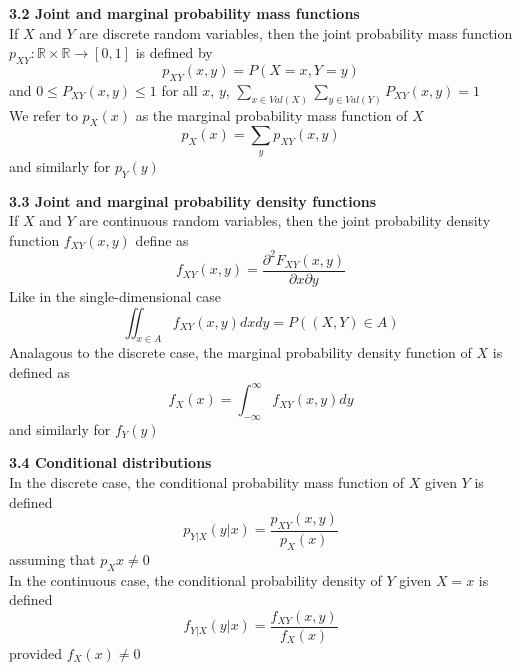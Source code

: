 \documentclass[10pt,a4paper,oneside]{beamer}
\begin{document}
\begin{frame}
\vspace{0.5cm}
{\bfseries 3.2 Joint and marginal probability mass functions} 
\vspace{0.5cm}
\\If $X$ and $Y$ are discrete random variables, then the joint probability mass function $p_{X Y} : \mathbb{R} \times \mathbb{R} \rightarrow[0,1]$ is defined by
\[
p_{X Y}(x, y)=P(X=x, Y=y)
\]
and  $0\leqslant P_{XY}(x,y)\leqslant1$ for all $x$, $y$,   $\sum_{x \in V a l(X)} \sum_{y \in V a l(Y)} P_{X Y}(x, y)=1$
\vspace{0.7cm}
\\We refer to $p_X(x)$ as the marginal probability mass function of $X$
\[
p_{X}(x)=\sum_{y} p_{X Y}(x, y)
\]
and similarly for $p_Y(y)$
\end{frame}
\begin{frame}
\vspace{0.3cm}
{\bfseries 3.3 Joint and marginal probability density functions} 
\vspace{0.5cm}
\\If $X$ and $Y$ are continuous random variables, then the joint probability density function $f_{X Y}(x,y)$ define as 
\[
f_{X Y}(x, y)=\frac{\partial^{2} F_{X Y}(x, y)}{\partial x \partial y}
\]
Like in the single-dimensional case
\[
\iint_{x \in A} f_{X Y}(x, y) d x d y=P((X, Y) \in A)
\]
Analagous to the discrete case, the marginal probability density function of $X$ is defined as
\[
f_{X}(x)=\int_{-\infty}^{\infty} f_{X Y}(x, y) d y
\]
and similarly for $f_Y(y)$
\end{frame}
\begin{frame}
\vspace{0.3cm}
{\bfseries 3.4 Conditional distributions} 
\vspace{0.5cm}
\\In the discrete case, the conditional probability mass function of $X$ given $Y$ is defined
\[
p_{Y | X}(y | x)=\frac{p_{X Y}(x, y)}{p_{X}(x)}
\]
assuming that $p_X{x}\neq0$
\vspace{0.5cm}
\\In the continuous case, the conditional probability density of $Y$ given $X=x$ is defined
\[
f_{Y | X}(y | x)=\frac{f_{X Y}(x, y)}{f_{X}(x)}
\]
provided $f_X(x)\neq 0$
\end{frame}
\end{document}
